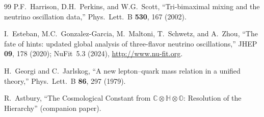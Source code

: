 \documentclass[12pt,a4paper]{article}
\theoremstyle{definition}
\theoremstyle{remark}
\newcommand{\Oct}{\mathbb{O}}
\newcommand{\Quat}{\mathbb{H}}
\newcommand{\Comp}{\mathbb{C}}
\begin{document}
\begin{thebibliography}{99}
P.F.~Harrison, D.H.~Perkins, and W.G.~Scott, ``Tri-bimaximal mixing and 
the neutrino oscillation data,'' Phys.\ Lett.\ B \textbf{530}, 167 (2002).

I.~Esteban, M.C.~Gonzalez-Garcia, M.~Maltoni, T.~Schwetz, and A.~Zhou,
``The fate of hints: updated global analysis of three-flavor neutrino 
oscillations,'' JHEP \textbf{09}, 178 (2020); NuFit~5.3 (2024), 
\url{http://www.nu-fit.org}.

H.~Georgi and C.~Jarlskog, ``A new lepton--quark mass relation in a 
unified theory,'' Phys.\ Lett.\ B \textbf{86}, 297 (1979).

R.~Astbury, ``The Cosmological Constant from 
$\Comp\otimes\Quat\otimes\Oct$: Resolution of the Hierarchy'' 
(companion paper).

\end{thebibliography}
\end{document}
